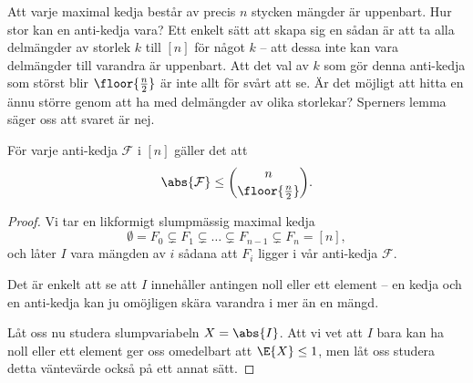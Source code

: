 \documentclass[nobib]{tufte-handout}
\begin{document}
Att varje maximal kedja består av precis $n$ stycken mängder är uppenbart. Hur stor kan en anti-kedja vara? Ett enkelt sätt att skapa sig en sådan är att ta alla delmängder av storlek $k$ till $[n]$ för något $k$ -- att dessa inte kan vara delmängder till varandra är uppenbart. Att det val av $k$ som gör denna anti-kedja som störst blir $\floor{\frac{n}{2}}$ är inte allt för svårt att se. Är det möjligt att hitta en ännu större genom att ha med delmängder av olika storlekar? Sperners lemma säger oss att svaret är nej.

\begin{lemma}
    För varje anti-kedja $\mathcal{F}$ i $[n]$ gäller det att
    $$\abs{\mathcal{F}} \leq \binom{n}{\floor{\frac{n}{2}}}.$$

    \begin{proof}
        Vi tar en likformigt slumpmässig maximal kedja
        $$\emptyset = F_0 \subsetneq F_1 \subsetneq \ldots \subsetneq F_{n-1} \subsetneq F_n = [n],$$
        och låter $I$ vara mängden av $i$ sådana att $F_i$ ligger i vår anti-kedja $\mathcal{F}$.

        Det är enkelt att se att $I$ innehåller antingen noll eller ett element -- en kedja och en anti-kedja kan ju omöjligen skära varandra i mer än en mängd.

        Låt oss nu studera slumpvariabeln $X = \abs{I}$. Att vi vet att $I$ bara kan ha noll eller ett element ger oss omedelbart att $\E{X} \leq 1$, men låt oss studera detta väntevärde också på ett annat sätt.


\end{proof}
\end{lemma}
\end{document}
